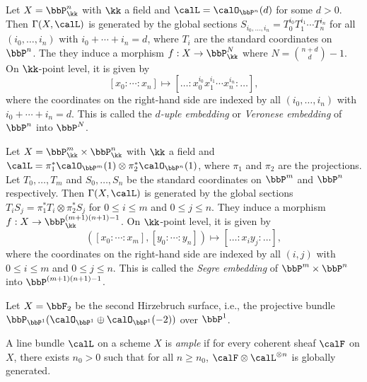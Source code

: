     \begin{example}\label{eg:d-uple_embedding_or_Veronese_embedding}
        Let \(X=\bbP^n_\kk\) with \(\kk\) a field and \(\calL=\calO_{\bbP^n}(d)\) for some \(d>0\).
        Then \(\Gamma(X,\calL)\) is generated by the global sections \(S_{i_0,\ldots,i_n}=T_0^{i_0}T_1^{i_1}\cdots T_n^{i_n}\) for all \((i_0,\ldots,i_n)\) with \(i_0+\cdots+i_n=d\), where \(T_i\) are the standard coordinates on \(\bbP^n\).
        The they induce a morphism \(f:X\to \bbP^N_\kk\) where \(N=\binom{n+d}{d}-1\).
        On \(\kk\)-point level, it is given by
        \[
            [x_0:\cdots:x_n] \mapsto [\ldots:x_0^{i_0}x_1^{i_1}\cdots x_n^{i_n}:\ldots],
        \]
        where the coordinates on the right-hand side are indexed by all \((i_0,\ldots,i_n)\) with \(i_0+\cdots+i_n=d\).
        This is called the \emph{\(d\)-uple embedding} or \emph{Veronese embedding} of \(\bbP^n\) into \(\bbP^N\).
    \end{example}

    \begin{example}\label{eg:Segre_embedding}
        Let \(X=\bbP^m_\kk \times \bbP^n_\kk\) with \(\kk\) a field and \(\calL=\pi_1^*\calO_{\bbP^m}(1) \otimes \pi_2^*\calO_{\bbP^n}(1)\), where \(\pi_1\) and \(\pi_2\) are the projections.
        Let \(T_0,\ldots,T_m\) and \(S_0,\ldots,S_n\) be the standard coordinates on \(\bbP^m\) and \(\bbP^n\) respectively.
        Then \(\Gamma(X,\calL)\) is generated by the global sections \(T_i S_j = \pi_1^*T_i \otimes \pi_2^*S_j\) for \(0\leq i \leq m\) and \(0\leq j \leq n\).
        They induce a morphism \(f:X\to \bbP^{(m+1)(n+1)-1}_\kk\).
        On \(\kk\)-point level, it is given by
        \[ ([x_0:\cdots:x_m],[y_0:\cdots:y_n]) \mapsto [\ldots:x_i y_j:\ldots], \]
        where the coordinates on the right-hand side are indexed by all \((i,j)\) with \(0\leq i \leq m\) and \(0\leq j \leq n\).
        This is called the \emph{Segre embedding} of \(\bbP^m \times \bbP^n\) into \(\bbP^{(m+1)(n+1)-1}\).
    \end{example}

    \begin{example}\label{eg:morphism_induced_by_-K_of_Hirzebruch_surface_F_2}
        Let \(X=\bbF_2\) be the second Hirzebruch surface, i.e., the projective bundle \(\bbP_{\bbP^1}(\calO_{\bbP^1}\oplus \calO_{\bbP^1}(-2))\) over \(\bbP^1\).
    \end{example}


    \begin{definition}\label{def:ample_line_bundle}
        A line bundle \(\calL\) on a scheme \(X\) is \emph{ample} if for every coherent sheaf \(\calF\) on \(X\), there exists \(n_0>0\) such that for all \(n\ge n_0\), \(\calF\otimes \calL^{\otimes n}\) is globally generated.
    \end{definition}

